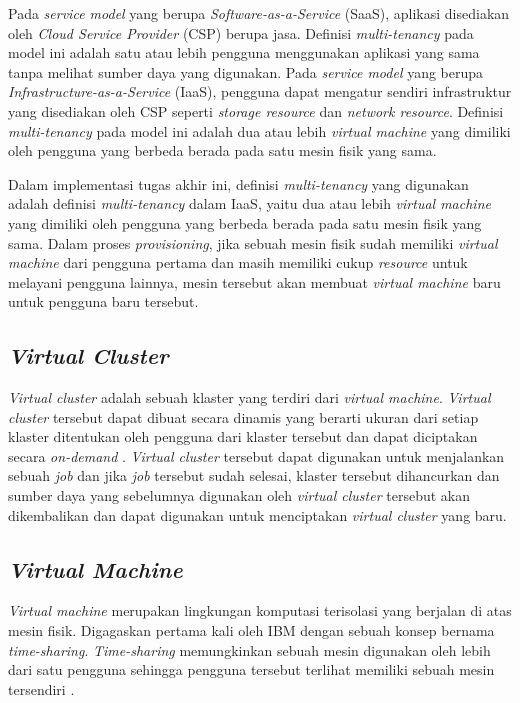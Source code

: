 Pada \emph{service model} yang berupa \emph{Software-as-a-Service} (SaaS), aplikasi
disediakan oleh \emph{Cloud Service Provider} (CSP) berupa jasa. Definisi \emph{multi-tenancy}
pada model ini adalah satu atau lebih pengguna menggunakan aplikasi yang sama tanpa melihat
sumber daya yang digunakan. Pada \emph{service model} yang berupa \emph{Infrastructure-as-a-Service} (IaaS), pengguna
dapat mengatur sendiri infrastruktur yang disediakan oleh CSP seperti \emph{storage resource} dan \emph{network resource}.
Definisi \emph{multi-tenancy} pada model ini adalah dua atau lebih \emph{virtual machine}
yang dimiliki oleh pengguna yang berbeda berada pada satu mesin fisik yang sama.

Dalam implementasi tugas akhir ini, definisi \emph{multi-tenancy} yang digunakan adalah definisi
\emph{multi-tenancy} dalam IaaS, yaitu dua atau lebih \emph{virtual machine} yang dimiliki oleh
pengguna yang berbeda berada pada satu mesin fisik yang sama. Dalam proses \emph{provisioning}, jika
sebuah mesin fisik sudah memiliki \emph{virtual machine} dari pengguna pertama dan
masih memiliki cukup \emph{resource} untuk melayani pengguna lainnya, mesin tersebut
akan membuat \emph{virtual machine} baru untuk pengguna baru tersebut.

\subsection{\emph{Virtual Cluster}}
\label{sec:virtual-cluster}

\emph{Virtual cluster} adalah sebuah klaster yang terdiri dari
\emph{virtual machine}. \emph{Virtual cluster} tersebut dapat dibuat
secara dinamis yang berarti ukuran dari setiap klaster ditentukan
oleh pengguna dari klaster tersebut dan dapat diciptakan secara
\emph{on-demand} \parencite{6133210}. \emph{Virtual cluster}
tersebut dapat digunakan untuk menjalankan sebuah \emph{job}
dan jika \emph{job} tersebut sudah selesai, klaster tersebut
dihancurkan dan sumber daya yang sebelumnya digunakan oleh
\emph{virtual cluster} tersebut akan dikembalikan dan dapat
digunakan untuk menciptakan \emph{virtual cluster} yang baru.

\subsection{\emph{Virtual Machine}}
\label{sec:virtual-machine}

\emph{Virtual machine} merupakan lingkungan komputasi terisolasi
yang berjalan di atas mesin fisik. Digagaskan pertama kali oleh IBM
dengan sebuah konsep bernama \emph{time-sharing}. \emph{Time-sharing}
memungkinkan sebuah mesin digunakan oleh lebih dari satu pengguna sehingga
pengguna tersebut terlihat memiliki sebuah mesin tersendiri \parencite{ibm-website}.

